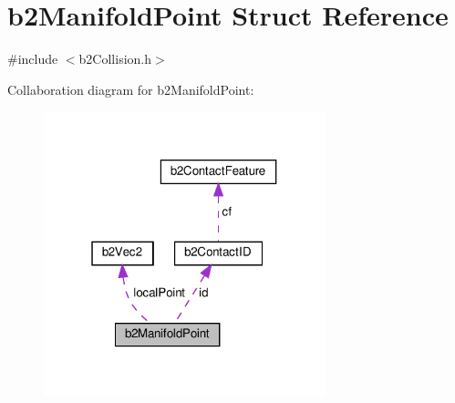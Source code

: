 \hypertarget{structb2ManifoldPoint}{}\section{b2\+Manifold\+Point Struct Reference}
\label{structb2ManifoldPoint}


{\ttfamily \#include $<$b2\+Collision.\+h$>$}



Collaboration diagram for b2\+Manifold\+Point\+:
\nopagebreak
\begin{figure}[H]
\begin{center}
\leavevmode
\includegraphics[width=232pt]{structb2ManifoldPoint__coll__graph}
\end{center}
\end{figure}
